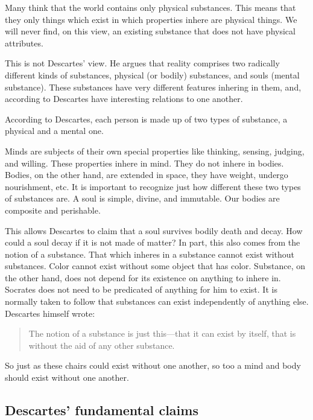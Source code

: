 \documentclass[]{article}
\begin{document}
Many think that the world contains only physical substances. This means
that they only things which exist in which properties inhere are
physical things. We will never find, on this view, an existing substance
that does not have physical attributes.

This is not Descartes' view. He argues that reality comprises two
radically different kinds of substances, physical (or bodily)
substances, and souls (mental substance). These substances have very
different features inhering in them, and, according to Descartes have
interesting relations to one another.

According to Descartes, each person is made up of two types of
substance, a physical and a mental one.

Minds are subjects of their own special properties like thinking,
sensing, judging, and willing. These properties inhere in mind. They do
not inhere in bodies. Bodies, on the other hand, are extended in space,
they have weight, undergo nourishment, etc. It is important to recognize
just how different these two types of substances are. A soul is simple,
divine, and immutable. Our bodies are composite and perishable.

This allows Descartes to claim that a soul survives bodily death and
decay. How could a soul decay if it is not made of matter? In part, this
also comes from the notion of a substance. That which inheres in a
substance cannot exist without substances. Color cannot exist without
some object that has color. Substance, on the other hand, does not
depend for its existence on anything to inhere in. Socrates does not
need to be predicated of anything for him to exist. It is normally taken
to follow that substances can exist independently of anything else.
Descartes himself wrote:

\begin{quote}
The notion of a substance is just this---that it can exist by itself,
that is without the aid of any other substance.
\end{quote}

So just as these chairs could exist without one another, so too a mind
and body should exist without one another.

\subsection{Descartes' fundamental
claims}\label{descartes-fundamental-claims}
\end{document}
